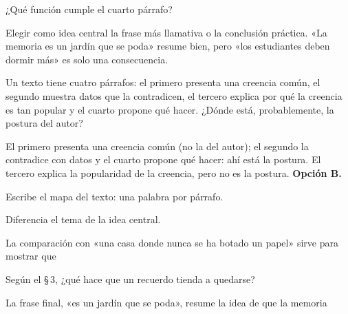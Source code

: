 \begin{comentada}{¿Qué función cumple el cuarto párrafo?}
\end{comentada}

\begin{trampa}
Elegir como idea central la frase más llamativa o la conclusión práctica. «La memoria es un jardín que se poda» resume bien,
pero «los estudiantes deben dormir más» es solo una consecuencia.
\end{trampa}

\begin{reto}
Un texto tiene cuatro párrafos: el primero presenta una creencia común, el segundo muestra datos que la contradicen, el
tercero explica por qué la creencia es tan popular y el cuarto propone qué hacer. ¿Dónde está, probablemente, la postura
del autor?
\end{reto}

\begin{retoresuelto}
El primero presenta una creencia común (no la del autor); el segundo la contradice con datos y el cuarto propone qué hacer:
ahí está la postura. El tercero explica la popularidad de la creencia, pero no es la postura. \textbf{Opción B.}
\end{retoresuelto}

\taller
{}
\begin{ejercicios}
\item Escribe el mapa del texto: una palabra por párrafo. 
\item Diferencia el tema de la idea central. 
\end{ejercicios}
\begin{ejercicios}
\item La comparación con «una casa donde nunca se ha botado un papel»  sirve para mostrar que
\item Según el \S\,3, ¿qué hace que un recuerdo tienda a quedarse?
\item La frase final, «es un jardín que se poda», resume la idea de que la memoria
\end{ejercicios}

